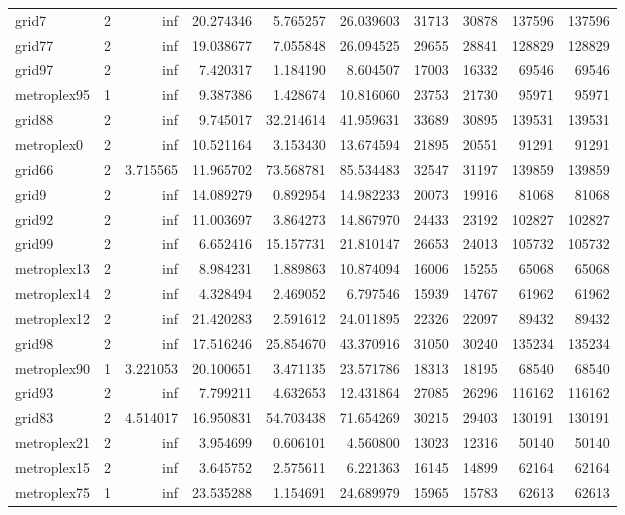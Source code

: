 \begin{longtable}{|l|r|r|r|r|r|r|r|r|r|}
grid7 & 2 & inf & 20.274346 & 5.765257 & 26.039603 & 31713 & 30878 & 137596 & 137596 \\
grid77 & 2 & inf & 19.038677 & 7.055848 & 26.094525 & 29655 & 28841 & 128829 & 128829 \\
grid97 & 2 & inf & 7.420317 & 1.184190 & 8.604507 & 17003 & 16332 & 69546 & 69546 \\
metroplex95 & 1 & inf & 9.387386 & 1.428674 & 10.816060 & 23753 & 21730 & 95971 & 95971 \\
grid88 & 2 & inf & 9.745017 & 32.214614 & 41.959631 & 33689 & 30895 & 139531 & 139531 \\
metroplex0 & 2 & inf & 10.521164 & 3.153430 & 13.674594 & 21895 & 20551 & 91291 & 91291 \\
grid66 & 2 & 3.715565 & 11.965702 & 73.568781 & 85.534483 & 32547 & 31197 & 139859 & 139859 \\
grid9 & 2 & inf & 14.089279 & 0.892954 & 14.982233 & 20073 & 19916 & 81068 & 81068 \\
grid92 & 2 & inf & 11.003697 & 3.864273 & 14.867970 & 24433 & 23192 & 102827 & 102827 \\
grid99 & 2 & inf & 6.652416 & 15.157731 & 21.810147 & 26653 & 24013 & 105732 & 105732 \\
metroplex13 & 2 & inf & 8.984231 & 1.889863 & 10.874094 & 16006 & 15255 & 65068 & 65068 \\
metroplex14 & 2 & inf & 4.328494 & 2.469052 & 6.797546 & 15939 & 14767 & 61962 & 61962 \\
metroplex12 & 2 & inf & 21.420283 & 2.591612 & 24.011895 & 22326 & 22097 & 89432 & 89432 \\
grid98 & 2 & inf & 17.516246 & 25.854670 & 43.370916 & 31050 & 30240 & 135234 & 135234 \\
metroplex90 & 1 & 3.221053 & 20.100651 & 3.471135 & 23.571786 & 18313 & 18195 & 68540 & 68540 \\
grid93 & 2 & inf & 7.799211 & 4.632653 & 12.431864 & 27085 & 26296 & 116162 & 116162 \\
grid83 & 2 & 4.514017 & 16.950831 & 54.703438 & 71.654269 & 30215 & 29403 & 130191 & 130191 \\
metroplex21 & 2 & inf & 3.954699 & 0.606101 & 4.560800 & 13023 & 12316 & 50140 & 50140 \\
metroplex15 & 2 & inf & 3.645752 & 2.575611 & 6.221363 & 16145 & 14899 & 62164 & 62164 \\
metroplex75 & 1 & inf & 23.535288 & 1.154691 & 24.689979 & 15965 & 15783 & 62613 & 62613 \\

\end{longtable}
